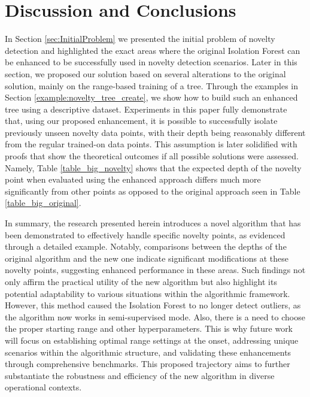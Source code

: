 \section{Discussion and Conclusions}
\label{sec:conclusion}
In Section \ref{sec:InitialProblem} we presented the initial problem of novelty detection and highlighted the exact areas where the original Isolation Forest can be enhanced to be successfully used in novelty detection scenarios.
Later in this section, we proposed our solution based on several alterations to the original solution, mainly on the range-based training of a tree.
Through the examples in Section \ref{example:novelty_tree_create}, we show how to build such an enhanced tree using a descriptive dataset.
Experiments in this paper fully demonstrate that, using our proposed enhancement, it is possible to successfully isolate previously unseen novelty data points, with their depth being reasonably different from the regular trained-on data points.
This assumption is later solidified with proofs that show the theoretical outcomes if all possible solutions were assessed. Namely, Table \ref{table_big_novelty} shows that the expected depth of the novelty point when evaluated using the enhanced approach differs much more significantly from other points as opposed to the original approach seen in Table \ref{table_big_original}.

In summary, the research presented herein introduces a novel algorithm that has been demonstrated to effectively handle specific novelty points, as evidenced through a detailed example.
Notably, comparisons between the depths of the original algorithm and the new one indicate significant modifications at these novelty points, suggesting enhanced performance in these areas.
Such findings not only affirm the practical utility of the new algorithm but also highlight its potential adaptability to various situations within the algorithmic framework. 
However, this method caused the Isolation Forest to no longer detect outliers, as the algorithm now works in semi-supervised mode. 
Also, there is a need to choose the proper starting range and other hyperparameters. 
This is why future work will focus on establishing optimal range settings at the onset, addressing unique scenarios within the algorithmic structure, and validating these enhancements through comprehensive benchmarks.
This proposed trajectory aims to further substantiate the robustness and efficiency of the new algorithm in diverse operational contexts.
